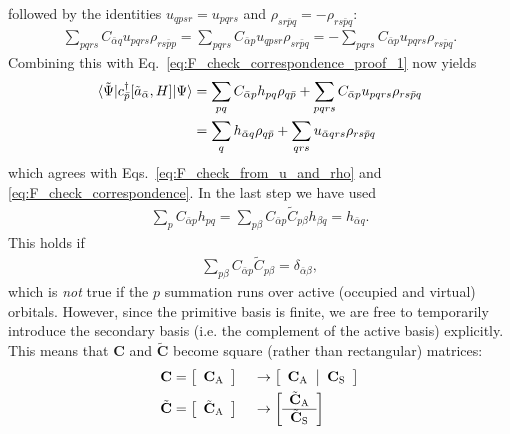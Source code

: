 \documentclass[aip,jcp,preprint,superscriptaddress,nofootinbib]{revtex4-1}
\begin{document}
followed by the identities $u_{qpsr} = u_{pqrs}$ and
$\rho_{sr\bar{p}q} = -\rho_{rs\bar{p}q}$:
\begin{align}
       \sum_{pqrs} C_{\bar{\alpha} q} u_{pqrs} \rho_{rs \bar{p} p} 
    =  \sum_{pqrs} C_{\bar{\alpha} p} u_{qpsr} \rho_{sr \bar{p} q}
    = -\sum_{pqrs} C_{\bar{\alpha} p} u_{pqrs} \rho_{rs \bar{p} q}.
\end{align}
Combining this with Eq.~\eqref{eq:F_check_correspondence_proof_1} now yields
\begin{align}
    \langle \tilde{\Psi} \vert  c^{\dagger}_{\bar{p}} [\tilde{a}_{\bar{\alpha}}, H]  \vert \Psi \rangle 
    &= \sum_{pq}   C_{\bar{\alpha} p} h_{pq}   \rho_{q \bar{p}}
    +  \sum_{pqrs} C_{\bar{\alpha} p} u_{pqrs} \rho_{rs \bar{p} q}  \nonumber\\
    &= \sum_{q}    h_{\bar{\alpha} q}   \rho_{q \bar{p}}
    +  \sum_{qrs}  u_{\bar{\alpha} qrs} \rho_{rs \bar{p} q}
    \label{eq:F_check_correspondence_proof_2}
\end{align}
which agrees with Eqs.~\eqref{eq:F_check_from_u_and_rho} and \eqref{eq:F_check_correspondence}.
In the last step we have used
\begin{align}
    \sum_{p}  C_{\bar{\alpha} p} h_{pq} 
    = \sum_{p \beta} C_{\bar{\alpha} p} \tilde{C}_{p \beta} h_{\beta q}
    = h_{\bar{\alpha} q}.
\end{align}
This holds if
\begin{align} \label{eq:C_C_tilde_inverse}
    \sum_{p \beta} C_{\bar{\alpha} p} \tilde{C}_{p \beta} = \delta_{\bar{\alpha} \beta},
\end{align}
which is \textit{not} true if the $p$ summation runs over active (occupied and virtual) orbitals. However,
since the primitive basis is finite,
we are free to temporarily introduce the secondary basis (i.e. the complement of the active basis) explicitly.
This means that $\mathbf{C}$ and $\tilde{\mathbf{C}}$ become square (rather than rectangular) matrices:
\begin{alignat}{2}
    \mathbf{C} 
    &= 
    \left[
	\begin{array}{c}
        \mathbf{C}_{\textsc{A}}
	\end{array} \right]
    {} &&\rightarrow
    \left[
	\begin{array}{c | c}
        \mathbf{C}_{\textsc{A}} {\,} & {\,} \mathbf{C}_{\textsc{S}} 
	\end{array} \right] \\
    \tilde{\mathbf{C}} 
    &= 
    \left[
	\begin{array}{c}
        \tilde{\mathbf{C}}_{\textsc{A}}
	\end{array} \right]
    {} &&\rightarrow
    \left[
	\begin{array}{c}
        \tilde{\mathbf{C}}_{\textsc{A}} \\
        \hline
        \tilde{\mathbf{C}}_{\textsc{S}} 
	\end{array} \right]
\end{alignat}
\end{document}
